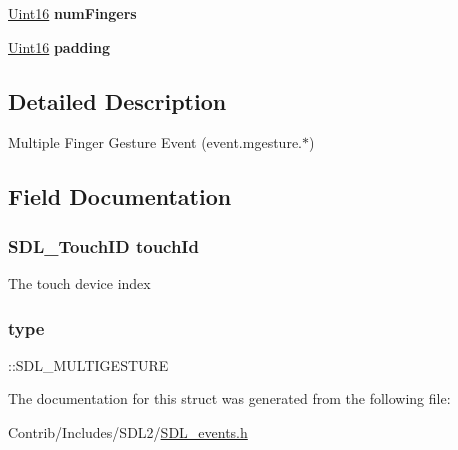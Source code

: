 \begin{DoxyCompactItemize}
\item 
\hyperlink{_s_d_l__stdinc_8h_a31fcc0a076c9068668173ee26d33e42b}{Uint16} {\bfseries num\+Fingers}\hypertarget{struct_s_d_l___multi_gesture_event_a243e821a31b9c308c8c119999c750bcb}{}\label{struct_s_d_l___multi_gesture_event_a243e821a31b9c308c8c119999c750bcb}

\item 
\hyperlink{_s_d_l__stdinc_8h_a31fcc0a076c9068668173ee26d33e42b}{Uint16} {\bfseries padding}\hypertarget{struct_s_d_l___multi_gesture_event_a489489d55916facdcdfcc2f20fe18309}{}\label{struct_s_d_l___multi_gesture_event_a489489d55916facdcdfcc2f20fe18309}

\end{DoxyCompactItemize}


\subsection{Detailed Description}
Multiple Finger Gesture Event (event.\+mgesture.$\ast$) 

\subsection{Field Documentation}
\subsubsection[{\texorpdfstring{touch\+Id}{touchId}}]{\setlength{\rightskip}{0pt plus 5cm}S\+D\+L\+\_\+\+Touch\+ID touch\+Id}\hypertarget{struct_s_d_l___multi_gesture_event_a35f615f6a1333a7d89297b58ed1e9bbb}{}\label{struct_s_d_l___multi_gesture_event_a35f615f6a1333a7d89297b58ed1e9bbb}
The touch device index 
\subsubsection[{\texorpdfstring{type}{type}}]{ type}\hypertarget{struct_s_d_l___multi_gesture_event_aa40a9b05c3154032b9f2d7220e9f08dc}{}\label{struct_s_d_l___multi_gesture_event_aa40a9b05c3154032b9f2d7220e9f08dc}
\+::\+S\+D\+L\+\_\+\+M\+U\+L\+T\+I\+G\+E\+S\+T\+U\+RE 

The documentation for this struct was generated from the following file\+:\begin{DoxyCompactItemize}
\item 
Contrib/\+Includes/\+S\+D\+L2/\hyperlink{_s_d_l__events_8h}{S\+D\+L\+\_\+events.\+h}\end{DoxyCompactItemize}
